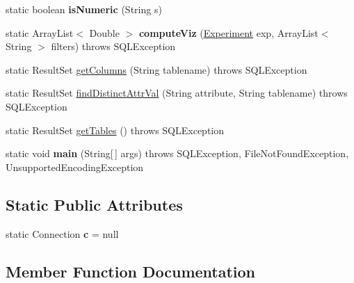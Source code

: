 \begin{DoxyCompactItemize}
\mbox{\label{classedu_1_1uiuc_1_1viz_1_1lattice_1_1_database_aefb44964489e83df40f17a0a37f54b31}} 
static boolean {\bfseries is\+Numeric} (String s)
\item 
\mbox{\label{classedu_1_1uiuc_1_1viz_1_1lattice_1_1_database_ac1958281cf3de5669030dbdf1a9a48f2}} 
static Array\+List$<$ Double $>$ {\bfseries compute\+Viz} (\mbox{\hyperlink{classedu_1_1uiuc_1_1viz_1_1algorithms_1_1_experiment}{Experiment}} exp, Array\+List$<$ String $>$ filters)  throws S\+Q\+L\+Exception 
\item 
static Result\+Set \mbox{\hyperlink{classedu_1_1uiuc_1_1viz_1_1lattice_1_1_database_aa3719cbaf0e7b9e83d9d2b5d2e886e71}{get\+Columns}} (String tablename)  throws S\+Q\+L\+Exception 
\item 
static Result\+Set \mbox{\hyperlink{classedu_1_1uiuc_1_1viz_1_1lattice_1_1_database_a9689e434eeac376dc2d6335f305560cc}{find\+Distinct\+Attr\+Val}} (String attribute, String tablename)  throws S\+Q\+L\+Exception 
\item 
static Result\+Set \mbox{\hyperlink{classedu_1_1uiuc_1_1viz_1_1lattice_1_1_database_a5c81d0679259b6824f1fa55dd24ae568}{get\+Tables}} ()  throws S\+Q\+L\+Exception 
\item 
\mbox{\label{classedu_1_1uiuc_1_1viz_1_1lattice_1_1_database_a551e56371cfa57867e6dbe3c615bacda}} 
static void {\bfseries main} (String\mbox{[}$\,$\mbox{]} args)  throws S\+Q\+L\+Exception, File\+Not\+Found\+Exception, Unsupported\+Encoding\+Exception      
\end{DoxyCompactItemize}
\subsection*{Static Public Attributes}
\begin{DoxyCompactItemize}
\item 
\mbox{\label{classedu_1_1uiuc_1_1viz_1_1lattice_1_1_database_ac75309efa3806cd99e152ddec8d78e60}} 
static Connection {\bfseries c} = null
\end{DoxyCompactItemize}


\subsection{Member Function Documentation}
\mbox{\label{classedu_1_1uiuc_1_1viz_1_1lattice_1_1_database_a9689e434eeac376dc2d6335f305560cc}} 
